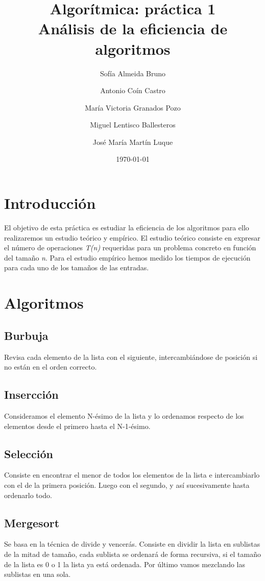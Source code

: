 \documentclass[11pt]{article}
\title{Algorítmica: práctica 1 \\ \large Análisis de la eficiencia de algoritmos}
\author{Sofía Almeida Bruno \and Antonio Coín Castro \and María Victoria Granados Pozo \and Miguel Lentisco Ballesteros \and José María Martín Luque}
\date{\today}
\begin{document}
\maketitle

\newpage

\section*{Introducción}
El objetivo de esta práctica es estudiar la eficiencia de los algoritmos para ello realizaremos un estudio teórico y empírico. 
El estudio teórico consiste en expresar el número de operaciones \textit{T(n)} requeridas para un problema concreto en función del tamaño \textit{n}. Para el estudio empírico hemos medido los tiempos de ejecución para cada uno de los tamaños de las entradas.

\section*{Algoritmos}
\subsection*{Burbuja}
Revisa cada elemento de la lista con el siguiente, intercambiándose de posición si no están en el orden correcto.
\subsection*{Insercción}
Consideramos el elemento N-ésimo de la lista y lo ordenamos respecto de los elementos desde el primero hasta el N-1-ésimo.

\subsection*{Selección}
Consiste en encontrar el menor de todos los elementos de la lista e intercambiarlo con el de la primera posición. Luego con el segundo, y así sucesivamente hasta ordenarlo todo.

\subsection*{Mergesort}
Se basa en la técnica de divide y vencerás. Consiste en dividir la lista en sublistas de la mitad de tamaño, cada sublista se ordenará de forma recursiva, si el tamaño de la lista es 0 o 1 la lista ya está ordenada. Por último vamos mezclando las sublistas en una sola.
\end{document}
